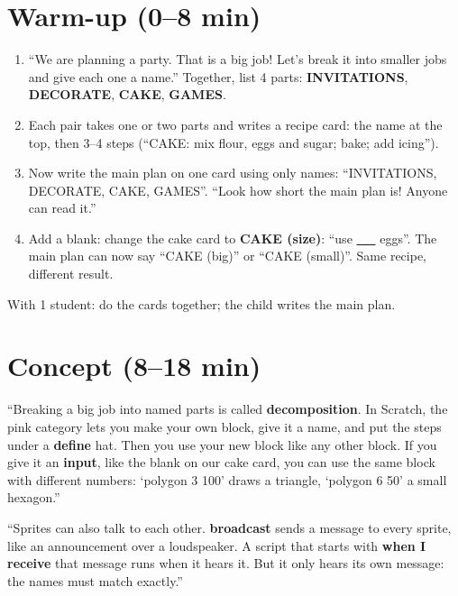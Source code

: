 \section{Warm-up (0--8 min)}
\begin{unplugged}
\begin{enumerate}[leftmargin=1.4em,itemsep=1pt]
  \item \enquote{We are planning a party. That is a big job! Let's break it into smaller jobs and give each one a name.} Together, list 4 parts: \textbf{INVITATIONS}, \textbf{DECORATE}, \textbf{CAKE}, \textbf{GAMES}.
  \item Each pair takes one or two parts and writes a recipe card: the name at the top, then 3--4 steps (\enquote{CAKE: mix flour, eggs and sugar; bake; add icing}).
  \item Now write the main plan on one card using only names: \enquote{INVITATIONS, DECORATE, CAKE, GAMES}. \enquote{Look how short the main plan is! Anyone can read it.}
  \item Add a blank: change the cake card to \textbf{CAKE (size)}: \enquote{use \underline{\ \ \ } eggs}. The main plan can now say \enquote{CAKE (big)} or \enquote{CAKE (small)}. Same recipe, different result.
\end{enumerate}
With 1 student: do the cards together; the child writes the main plan.
\end{unplugged}

\section{Concept (8--18 min)}
\begin{teacherscript}
\enquote{Breaking a big job into named parts is called \textbf{decomposition}. In Scratch, the pink  category lets you make your own block, give it a name, and put the steps under a \textbf{define} hat. Then you use your new block like any other block. If you give it an \textbf{input}, like the blank on our cake card, you can use the same block with different numbers: \enquote{polygon 3 100} draws a triangle, \enquote{polygon 6 50} a small hexagon.}

\enquote{Sprites can also talk to each other. \textbf{broadcast} sends a message to every sprite, like an announcement over a loudspeaker. A script that starts with \textbf{when I receive} that message runs when it hears it. But it only hears its own message: the names must match exactly.}
\end{teacherscript}

